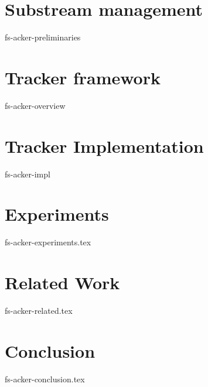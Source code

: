 \documentclass[review,%
10pt,twocolumn%
]{elsarticle}
\newcommand {\tracker} {trAcker}
\begin{document}
\section{Substream management}
 {fs-acker-preliminaries}

\section{Tracker framework}
 {fs-acker-overview}

\section{Tracker Implementation}
 {fs-acker-impl}

\section {Experiments}
 {fs-acker-experiments.tex}

\section{Related Work}
 {fs-acker-related.tex}

\section {Conclusion}
 {fs-acker-conclusion.tex}



% 

\end{document}
